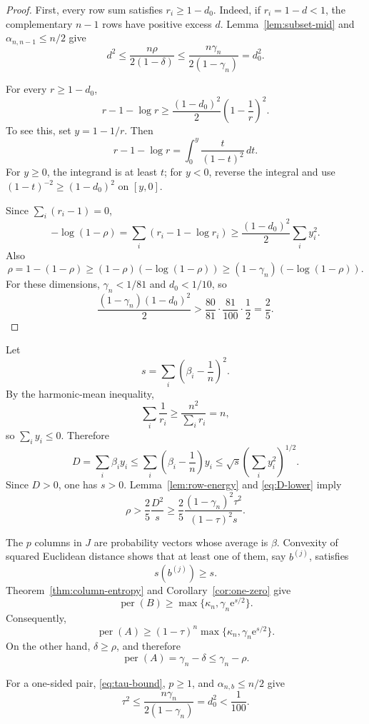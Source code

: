 \documentclass[11pt]{article}
\theoremstyle{definition}
\newcommand{\per}{\operatorname{per}}
\newcommand{\1}{\mathbf{1}}
\newcommand{\e}{\mathrm{e}}
\begin{document}
\begin{proof}
First, every row sum satisfies $r_i\ge1-d_0$.  Indeed, if $r_i=1-d<1$, the complementary $n-1$ rows have positive excess $d$.  Lemma~\ref{lem:subset-mid} and $\alpha_{n,n-1}\le n/2$ give
\[
 d^2\le\frac{n\rho}{2(1-\delta)}
 \le\frac{n\gamma_n}{2(1-\gamma_n)}=d_0^2.
\]

For every $r\ge1-d_0$,
\[
 r-1-\log r
 \ge\frac{(1-d_0)^2}{2}
 \left(1-\frac1r\right)^2.
 \tag{7.14}\label{eq:log-energy}
\]
To see this, set $y=1-1/r$.  Then
\[
 r-1-\log r=\int_0^y\frac{t}{(1-t)^2}\,dt.
\]
For $y\ge0$, the integrand is at least $t$; for $y<0$, reverse the integral and use $(1-t)^{-2}\ge(1-d_0)^2$ on $[y,0]$.

Since $\sum_i(r_i-1)=0$,
\[
 -\log(1-\rho)
 =\sum_i(r_i-1-\log r_i)
 \ge\frac{(1-d_0)^2}{2}\sum_i y_i^2.
\]
Also
\[
 \rho=1-(1-\rho)
 \ge(1-\rho)(-\log(1-\rho))
 \ge(1-\gamma_n)(-\log(1-\rho)).
\]
For these dimensions, $\gamma_n<1/81$ and $d_0<1/10$, so
\[
 \frac{(1-\gamma_n)(1-d_0)^2}{2}
 >\frac{80}{81}\cdot\frac{81}{100}\cdot\frac12
 =\frac25.
\]
\end{proof}

Let
\[
 s=\sum_i\left(\beta_i-\frac1n\right)^2.
 \tag{7.15}\label{eq:beta-s}
\]
By the harmonic-mean inequality,
\[
 \sum_i\frac1{r_i}\ge\frac{n^2}{\sum_i r_i}=n,
\]
so $\sum_i y_i\le0$.  Therefore
\[
 D=\sum_i\beta_i y_i
 \le
 \sum_i\left(\beta_i-\frac1n\right)y_i
 \le\sqrt{s}\left(\sum_i y_i^2\right)^{1/2}.
\]
Since $D>0$, one has $s>0$.  Lemma~\ref{lem:row-energy} and \eqref{eq:D-lower} imply
\[
 \rho>\frac25\frac{D^2}{s}
 \ge
 \frac25\frac{(1-\gamma_n)^2\tau^2}
 {(1-\tau)^2s}.
 \tag{7.16}\label{eq:rho-D-s}
\]

The $p$ columns in $J$ are probability vectors whose average is $\beta$.  Convexity of squared Euclidean distance shows that at least one of them, say $b^{(j)}$, satisfies
\[
 s(b^{(j)})\ge s.
\]
Theorem~\ref{thm:column-entropy} and Corollary~\ref{cor:one-zero} give
\[
 \per(B)\ge
 \max\{\kappa_n,\gamma_n\e^{s/2}\}.
 \tag{7.17}\label{eq:one-sided-per}
\]
Consequently,
\[
 \per(A)\ge
 (1-\tau)^n\max\{\kappa_n,\gamma_n\e^{s/2}\}.
 \tag{7.18}\label{eq:one-sided-lower}
\]
On the other hand, $\delta\ge\rho$, and therefore
\[
 \per(A)=\gamma_n-\delta\le\gamma_n-\rho.
 \tag{7.19}\label{eq:one-sided-upper}
\]

For a one-sided pair, \eqref{eq:tau-bound}, $p\ge1$, and $\alpha_{n,b}\le n/2$ give
\[
 \tau^2\le\frac{n\gamma_n}{2(1-\gamma_n)}=d_0^2<\frac1{100}.
 \tag{7.20}\label{eq:one-sided-tau}
\]
\end{document}
